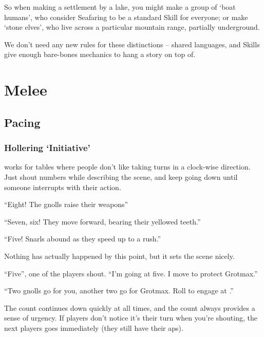 \begin{multicols}{2}
So when making a settlement by a lake, you might make a group of `boat humans', who consider Seafaring to be a standard Skill for everyone; or make `stone elves', who live across a particular mountain range, partially underground.

We don't need any new rules for these distinctions -- shared languages, and Skills give enough bare-bones mechanics to hang a story on top of.

\end{multicols}

\pagebreak

\section{Melee}

\begin{multicols}{2}

\subsection{Pacing}

\subsubsection{Hollering `Initiative'}
works for tables where people don't like taking turns in a clock-wise direction.
Just shout numbers while describing the scene, and keep going down until someone interrupts with their action.

\begin{speechtext}

``Eight! The gnolls raise their weapons''

``Seven, six! They move forward, bearing their yellowed teeth.''

``Five! Snarls abound as they speed up to a rush.''

\end{speechtext}

Nothing has actually happened by this point, but it sets the scene nicely.

\null
\begin{speechtext}
  ``Five'', one of the players shout.
  ``I'm going at five.
  I move to protect Grotmax.''

  ``Two gnolls go for you, another two go for Grotmax.
  Roll to engage at \tn[11].''

\end{speechtext}

The count continues down quickly at all times, and the count always provides a sense of urgency.
If players don't notice it's their turn when you're shouting, the next players goes immediately (they still have their \glspl{ap}).


\end{multicols}
